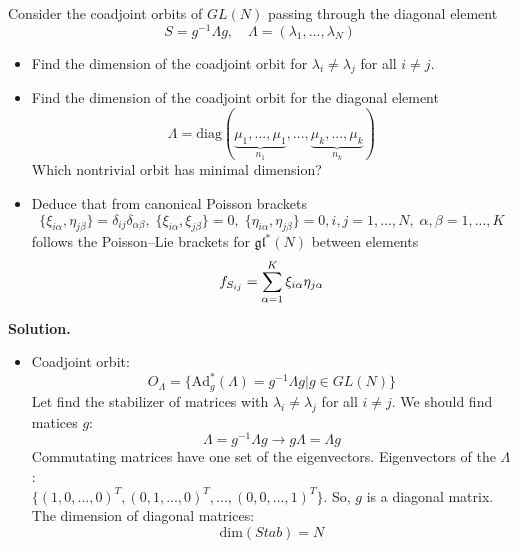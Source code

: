 \documentclass[12pt]{article}
\theoremstyle{definition}
\begin{document}
\begin{enumerate}
Consider the coadjoint orbits of $GL(N)$ passing through the diagonal element
\begin{equation}
    S=g^{-1}\Lambda g,\quad\Lambda=(\lambda_1,...,\lambda_N)
\end{equation}
\begin{itemize}
    \item Find the dimension of the coadjoint orbit for $\lambda_i\neq\lambda_j$ for all $i\neq j$.
    \item Find the dimension of the coadjoint orbit for the diagonal element
    \begin{equation}
        \Lambda=\text{diag}(\underbrace{\mu_1, ... , \mu_1}_{n_1},...,\underbrace{\mu_k, ... , \mu_k}_{n_k})
    \end{equation}
    Which nontrivial orbit has minimal dimension?
    \item  Deduce that from canonical Poisson brackets
    \begin{equation}
        \{\xi_{i\alpha},\eta_{j\beta}\} = \delta_{ij}\delta_{\alpha\beta},\; \{\xi_{i\alpha},\xi_{j\beta}\} = 0, \;\{\eta_{i\alpha},\eta_{j\beta}\} = 0, i,j = 1,..., N,\;\alpha,\beta = 1, ..., K
    \end{equation}
    follows the Poisson–Lie brackets for $\mathfrak{gl}^*(N)$ between elements
    \begin{equation}
        f_{S_{ij}}=\sum_{\alpha=1}^{K}\limits \xi_{i\alpha}\eta_{j\alpha}
    \end{equation}
\end{itemize}
\textbf{Solution.}
\begin{itemize}
    \item Coadjoint orbit:
    \begin{equation}
        O_\Lambda=\{\text{Ad}^*_g(\Lambda)=g^{-1}\Lambda g|g\in GL(N)\}
    \end{equation}
    Let find the stabilizer of matrices with $\lambda_i\neq\lambda_j$ for all $i\neq j$. We should find matices $g$:
    \begin{equation}
        \Lambda=g^{-1}\Lambda g\rightarrow g\Lambda=\Lambda g
    \end{equation}
    Commutating matrices have one set of the eigenvectors. Eigenvectors of the $\Lambda$:\\
    $\{(1,0,...,0)^T,(0,1,...,0)^T,...,(0,0,...,1)^T\}$. So, $g$ is a diagonal matrix. The dimension of diagonal matrices:
    \begin{equation}
        \text{dim}(Stab)=N
    \end{equation}

\end{itemize}
\end{enumerate}
\end{document}
